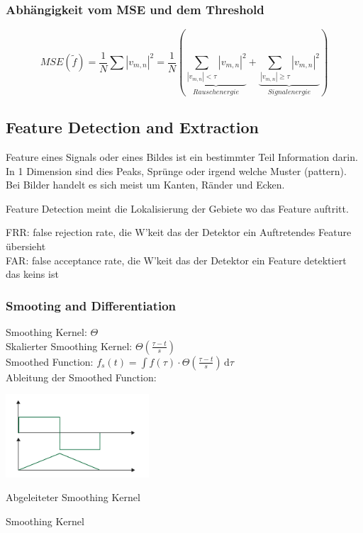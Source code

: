 \subsubsection{Abhängigkeit vom MSE und dem Threshold}
\[ MSE(\tilde{f}) = \frac{1}{N} \sum |v_{m,n}|^2 = \frac{1}{N}\left(\underbrace{\sum_{|v_{m,n}| < \tau}|v_{m,n}|^2}_{Rauschenergie} + \underbrace{\sum_{|v_{m,n}| \geq \tau}|v_{m,n}|^2}_{Signalenergie}\right) \]

\newpage
\subsection{Feature Detection and Extraction }

Feature eines Signals oder eines Bildes ist ein bestimmter Teil Information darin. In 1 Dimension sind dies Peaks, Sprünge oder irgend welche Muster (pattern). Bei Bilder handelt es sich meist um Kanten, Ränder und Ecken.

Feature Detection meint die Lokalisierung der Gebiete wo das Feature auftritt.

FRR: false rejection rate, die W'keit das der Detektor ein Auftretendes Feature übersieht\\
FAR: false acceptance rate, die W'keit das der Detektor ein Feature detektiert das keins ist

\subsubsection{Smooting and Differentiation}
\begin{minipage}[r]{0.5\textwidth}
Smoothing Kernel: $\Theta$\\
Skalierter Smoothing Kernel: $\Theta(\frac{\tau - t}{s})$\\
Smoothed Function: $f_s(t) = \int f(\tau) \cdot \Theta(\frac{\tau - t}{s}) \, \mathrm{d}\tau$\\
Ableitung der Smoothed Function: 
\end{minipage}
\begin{minipage}[r]{0.5\textwidth}
	\includegraphics[width=0.4\textwidth]{content/SmoothingFunction.pdf}
	
	\vspace{-2.2cm}
	
	\flushright
	Abgeleiteter Smoothing Kernel
	
	\vspace{.4cm}
	
	Smoothing Kernel	
\end{minipage}

